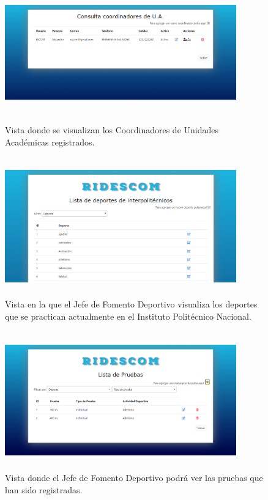 		\begin{figure} [hbt!]
			\centering
			\includegraphics[width=10cm, height=6cm]{Imagenes/Vistas/Vista6_ConsultaCoordJFD}
			\caption{Vista donde se visualizan los Coordinadores de Unidades Académicas registrados.}
			\label{VistaConsultaCoord}
		\end{figure}
		
		\begin{figure} [hbt!]
			\centering
			\includegraphics[width=10cm, height=6cm]{Imagenes/Vistas/Vista7_DeportesJFD}
			\caption{Vista en la que el Jefe de Fomento Deportivo visualiza los deportes que se practican actualmente en el Instituto Politécnico Nacional.}
			\label{VistaDeportes}
		\end{figure}
		
		\begin{figure} [hbt!]
			\centering
			\includegraphics[width=10cm, height=6cm]{Imagenes/Vistas/Vista8_PruebaJFD}
			\caption{Vista donde el Jefe de Fomento Deportivo podrá ver las pruebas que han sido registradas.}
			\label{VistaPruebas}
		\end{figure}
	
